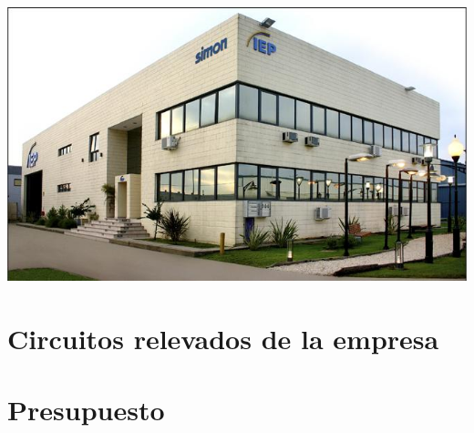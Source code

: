 \documentclass[12pt,titlepage]{report}
\begin{document}
\begin{center}
 \includegraphics[scale=0.75]{./Images/iep-instalacion.png}
\end{center}



\pagebreak
\section{Circuitos relevados de la empresa}

\pagebreak

\pagebreak


\pagebreak
\section{Presupuesto}

\end{document}
